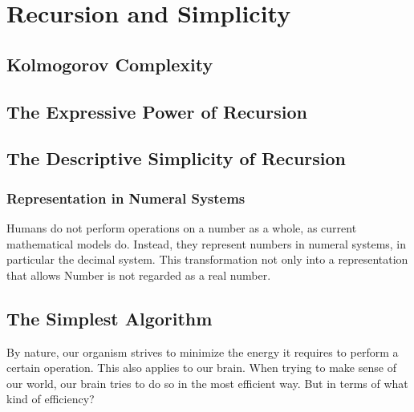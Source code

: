 

\chapter{Recursion and Simplicity}
\section{Kolmogorov Complexity}



\section{The Expressive Power of Recursion}

\section{The Descriptive Simplicity of Recursion}
\subsection{Representation in Numeral Systems}
Humans do not perform operations on a number as a whole, as current mathematical models do. Instead, they represent numbers in numeral systems, in particular the decimal system. This transformation not only into a representation that allows
Number is not regarded as a real number.

\section{The Simplest Algorithm}
By nature, our organism strives to minimize the energy it requires to perform a certain operation. This also applies to our brain. When trying to make sense of our world, our brain tries to do so in the most efficient way. But in terms of what kind of efficiency?

